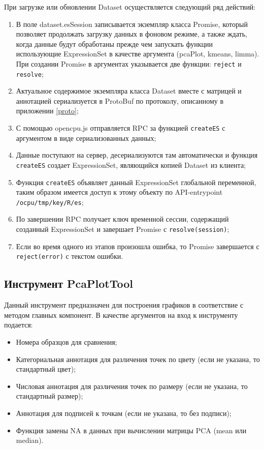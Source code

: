 \documentclass[annotation,specification]{itmo-student-thesis}
\begin{document}
При загрузке или обновлении Dataset осуществляется следующий ряд действий:
\begin{enumerate}
\item В поле dataset.esSession записывается экземпляр класса Promise, который позволяет продолжать загрузку данных в фоновом режиме, а также ждать, когда данные будут обработаны прежде чем запускать функции использующие ExpressionSet в качестве аргумента (pcaPlot, kmeans, limma). При создании Promise в аргументах указывается две функции: \texttt{reject} и \texttt{resolve};
\item Актуальное содержимое экземпляра класса Dataset вместе с матрицей и аннотацией сериализуется в ProtoBuf по протоколу, описанному в приложении \ref{proto};
\item С помощью opencpu.js отправляется RPC за функцией \texttt{createES} с аргументом в виде сериализованных данных;
\item Данные поступают на сервер, десериализуются там автоматически и функция \texttt{createES} создает ExpressionSet, являющийся копией Dataset из клиента;
\item Функция \texttt{createES} объявляет данный ExpressionSet глобальной переменной, таким образом имеется доступ к этому объекту по API-entrypoint \texttt{/ocpu/tmp/{key}/R/es};
\item По завершении RPC получает ключ временной сессии, содержащий созданный ExpressionSet и завершает Promise с \texttt{resolve(session)};
\item Если во время одного из этапов произошла ошибка, то Promise завершается с \texttt{reject(error)} с текстом ошибки.
\end{enumerate}

\subsection{Инструмент PcaPlotTool}
Данный инструмент предназначен для построения графиков в соответствие с методом главных компонент.
В качестве аргументов на вход к инструменту подается:
\begin{itemize}
\item Номера образцов для сравнения;
\item Категориальная аннотация для различения точек по цвету (если не указана, то стандартный цвет);
\item Числовая аннотация для различения точек по размеру (если не указана, то стандартный размер);
\item Аннотация для подписей к точкам (если не указана, то без подписи);
\item Функция замены NA в данных при вычислении матрицы PCA (mean или median).
\end{itemize}
\end{document}
